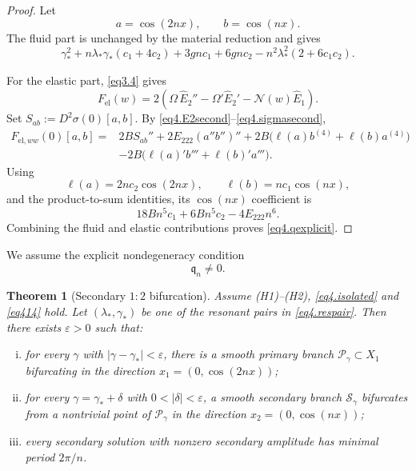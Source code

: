 \documentclass[12pt]{article}
\numberwithin{equation}{section}
\newtheorem{theorem}{Theorem}[section]
\numberwithin{equation}{section}
\begin{document}
\begin{proof}
Let
\[
a=\cos(2nx),\qquad b=\cos(nx).
\]
The fluid part is unchanged by the material reduction and gives
\[
\gamma_*^2
+n\lambda_*\gamma_*(c_1+4c_2)
+3gnc_1+6gnc_2
-n^2\lambda_*^2(2+6c_1c_2).
\]

For the elastic part, \eqref{eq3.4} gives
\[
F_{\mathrm{el}}(w)
=
2\left(
\Omega\,\widehat E_2''
-\Omega'\widehat E_2'
-\mathcal N(w)\widehat E_1
\right).
\]
Set $S_{ab}:=D^2\sigma(0)[a,b]$.  By
\eqref{eq4.E2second}--\eqref{eq4.sigmasecond},
\begin{align*}
F_{\mathrm{el},ww}(0)[a,b]
={}&
2B S_{ab}''
+2E_{222}(a''b'')''
+2B\bigl(\ell(a)b^{(4)}+\ell(b)a^{(4)}\bigr)\\
&-2B\bigl(\ell(a)'b'''+\ell(b)'a'''\bigr).
\end{align*}
Using
\[
\ell(a)=2nc_2\cos(2nx),\qquad
\ell(b)=nc_1\cos(nx),
\]
and the product-to-sum identities, its $\cos(nx)$ coefficient is
\[
18Bn^5c_1+6Bn^5c_2-4E_{222}n^6.
\]
Combining the fluid and elastic contributions proves \eqref{eq4.qexplicit}.
\end{proof}

We assume the explicit nondegeneracy condition
\begin{equation}\label{eq414}
\mathfrak q_n\neq0.
\end{equation}

\begin{theorem}[Secondary $1{:}2$ bifurcation]\label{thm4.1}
Assume (H1)--(H2), \eqref{eq4.isolated} and \eqref{eq414} hold.  Let
$(\lambda_*,\gamma_*)$ be one of the resonant pairs in \eqref{eq4.respair}.
Then there exists $\varepsilon>0$ such that:

\begin{enumerate}[(i)]
\item for every $\gamma$ with $|\gamma-\gamma_*|<\varepsilon$, there is a smooth
primary branch $\mathcal P_\gamma\subset X_1$ bifurcating in the direction
$x_1=(0,\cos(2nx))$;

\item for every $\gamma=\gamma_*+\delta$ with $0<|\delta|<\varepsilon$, a smooth
secondary branch $\mathcal S_\gamma$ bifurcates from a nontrivial point of
$\mathcal P_\gamma$ in the direction $x_2=(0,\cos(nx))$;

\item every secondary solution with nonzero secondary amplitude has minimal period
$2\pi/n$.
\end{enumerate}
\end{theorem}
\end{document}
